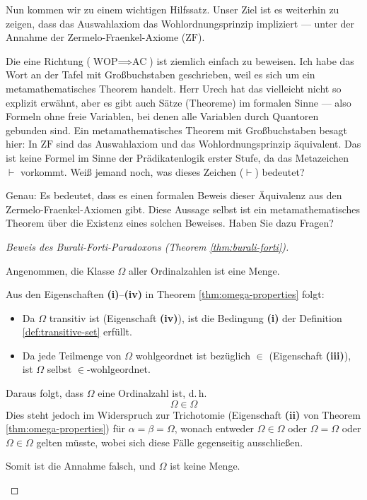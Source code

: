 \begin{spoken-clean}[00:49:58 - 00:53:23]
Nun kommen wir zu einem wichtigen Hilfssatz. Unser Ziel ist es weiterhin zu zeigen, dass das Auswahlaxiom das Wohlordnungsprinzip impliziert --- unter der Annahme der Zermelo-Fraenkel-Axiome ($\text{ZF}$).

Die eine Richtung ($\text{WOP} \implies \text{AC}$) ist ziemlich einfach zu beweisen. Ich habe das Wort  an der Tafel mit Großbuchstaben geschrieben, weil es sich um ein metamathematisches Theorem handelt. Herr Urech hat das vielleicht nicht so explizit erwähnt, aber es gibt auch Sätze (Theoreme) im formalen Sinne --- also Formeln ohne freie Variablen, bei denen alle Variablen durch Quantoren gebunden sind. Ein metamathematisches Theorem mit Großbuchstaben besagt hier: In $\text{ZF}$ sind das Auswahlaxiom und das Wohlordnungsprinzip äquivalent. Das ist keine Formel im Sinne der Prädikatenlogik erster Stufe, da das Metazeichen $\vdash$ vorkommt. Weiß jemand noch, was dieses Zeichen ($\vdash$) bedeutet?

Genau: Es bedeutet, dass es einen formalen Beweis dieser Äquivalenz aus den Zermelo-Fraenkel-Axiomen gibt. Diese Aussage selbst ist ein metamathematisches Theorem über die Existenz eines solchen Beweises. Haben Sie dazu Fragen?
\end{spoken-clean}

\begin{proof}[Beweis des Burali-Forti-Paradoxons (Theorem \ref{thm:burali-forti})]
\begin{math-stroke}
Angenommen, die Klasse $\Omega$ aller Ordinalzahlen ist eine Menge.

Aus den Eigenschaften \textbf{(i)}--\textbf{(iv)} in Theorem \ref{thm:omega-properties} folgt:
\begin{itemize}
    \item Da $\Omega$ transitiv ist (Eigenschaft \textbf{(iv)}), ist die Bedingung \textbf{(i)} der Definition \ref{def:transitive-set} erfüllt.
    \item Da jede Teilmenge von $\Omega$ wohlgeordnet ist bezüglich $\in$ (Eigenschaft \textbf{(iii)}), ist $\Omega$ selbst $\in$-wohlgeordnet.
\end{itemize}
Daraus folgt, dass $\Omega$ eine Ordinalzahl ist, d.\,h.
\[
\Omega \in \Omega
\]
Dies steht jedoch im Widerspruch zur Trichotomie (Eigenschaft \textbf{(ii)} von Theorem \ref{thm:omega-properties}) für $\alpha = \beta = \Omega$, wonach entweder $\Omega \in \Omega$ oder $\Omega = \Omega$ oder $\Omega \in \Omega$ gelten müsste, wobei sich diese Fälle gegenseitig ausschließen.

Somit ist die Annahme falsch, und $\Omega$ ist keine Menge.
\end{math-stroke}
\end{proof}

